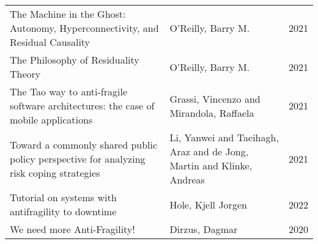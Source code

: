 \begin{longtable}{p{}p{}p{}}
		The Machine in the Ghost: Autonomy, Hyperconnectivity, and Residual Causality & O'Reilly, Barry M. & 2021 \\
		The Philosophy of Residuality Theory & O'Reilly, Barry M. & 2021 \\
		The Tao way to anti-fragile software architectures: the case of mobile applications & Grassi, Vincenzo and Mirandola, Raffaela & 2021 \\
		Toward a commonly shared public policy perspective for analyzing risk coping strategies & Li, Yanwei and Taeihagh, Araz and de Jong, Martin and Klinke, Andreas & 2021 \\
		Tutorial on systems with antifragility to downtime & Hole, Kjell Jorgen & 2022 \\
		We need more Anti-Fragility! & Dirzus, Dagmar & 2020 \\
	\bottomrule%
\end{longtable}
